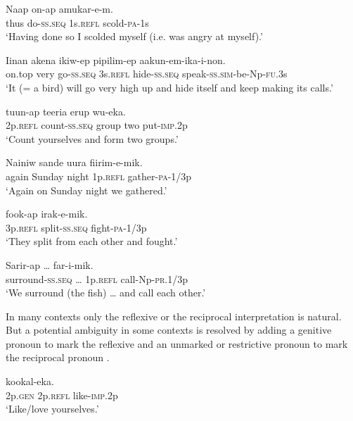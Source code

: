 \ea%
\label{ex:3:x610}
\gll Naap on-ap  amukar-e-m. \\
thus do-\textsc{ss}.\textsc{seq} 1s.\textsc{refl} scold-\textsc{pa}-1s\\
\glt`Having done so I scolded myself (i.e. was angry at myself).'
\z

\ea%
\label{ex:3:x1864}
\gll Iinan akena ikiw-ep  pipilim-ep aakun-em-ika-i-non.\\
on.top very go-\textsc{ss}.\textsc{seq} 3s.\textsc{refl} hide-\textsc{ss}.\textsc{seq} speak-\textsc{ss}.\textsc{sim}-be-Np-\textsc{fu}.3s\\
\glt`It (= a bird) will go very high up and hide itself and keep making its calls.'
\z

\ea%
\label{ex:3:x611}
\gll {} tuun-ap teeria erup wu-eka. \\
2p.\textsc{refl} count-\textsc{ss}.\textsc{seq} group two put-\textsc{imp}.2p\\
\glt`Count yourselves and form two groups.'
\z

\ea%
\label{ex:3:x1865}
\gll Nainiw sande uura  fiirim-e-mik. \\
again Sunday night 1p.\textsc{refl} gather-\textsc{pa}-1/3p\\
\glt`Again on Sunday night we gathered.'
\z

\ea%
\label{ex:3:x612}
\gll {} fook-ap irak-e-mik. \\
3p.\textsc{refl} split-\textsc{ss}.\textsc{seq} fight-\textsc{pa}-1/3p\\
\glt`They split from each other and fought.'
\z

\ea%
\label{ex:3:x1866}
\gll Sarir-ap {\dots }  far-i-mik. \\
surround-\textsc{ss}.\textsc{seq} {\dots} 1p.\textsc{refl} call-Np-\textsc{pr}.1/3p\\
\glt`We surround (the fish) {\dots} and call each other.'
\z

In many contexts only the reflexive or the reciprocal interpretation is natural. But a potential ambiguity in some contexts is resolved by adding a genitive pronoun to mark the reflexive  and an unmarked or restrictive pronoun to mark the reciprocal pronoun .

\ea%
\label{ex:3:x614}
\gll {}  kookal-eka. \\
2p.\textsc{gen} 2p.\textsc{refl} like-\textsc{imp}.2p\\
\glt`Like/love yourselves.'
\z

